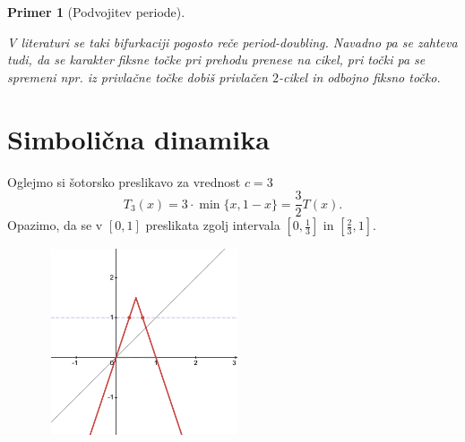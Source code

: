 \documentclass{article}
\newtheorem{primer}{Primer}
\begin{document}
\begin{primer}[Podvojitev periode]
\begin{center}
        \end{center}
        
        V literaturi se taki bifurkaciji pogosto reče period-doubling. 
        Navadno pa se zahteva tudi, da se karakter fiksne točke pri prehodu prenese na 
        cikel, pri točki pa se spremeni npr. iz privlačne točke dobiš 
        privlačen $2$-cikel in odbojno fiksno točko.
\end{primer}

\section{Simbolična dinamika}

Oglejmo si šotorsko preslikavo za vrednost $c = 3$
$$
T_3(x) = 3\cdot \min\{x, 1-x\} = \frac{3}{2} T(x).
$$
Opazimo, da se v $[0, 1]$ preslikata zgolj intervala $[0, \frac{1}{3}]$
in $[\frac{2}{3}, 1]$.

\begin{figure}[h!]
    \begin{center}
        \includegraphics[width=6cm, height=5.5cm]{Grafi/cobweb18.png}
    \end{center}
\end{figure}
\end{document}
